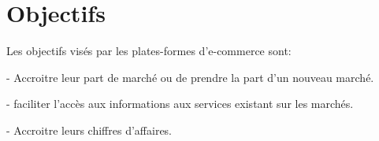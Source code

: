 \section{Objectifs}

Les objectifs visés par les plates-formes d’e-commerce sont:

- Accroitre leur part de marché ou de prendre la part d'un nouveau marché.

- faciliter l'accès aux informations aux services existant sur les marchés.

- Accroitre leurs chiffres d'affaires.



